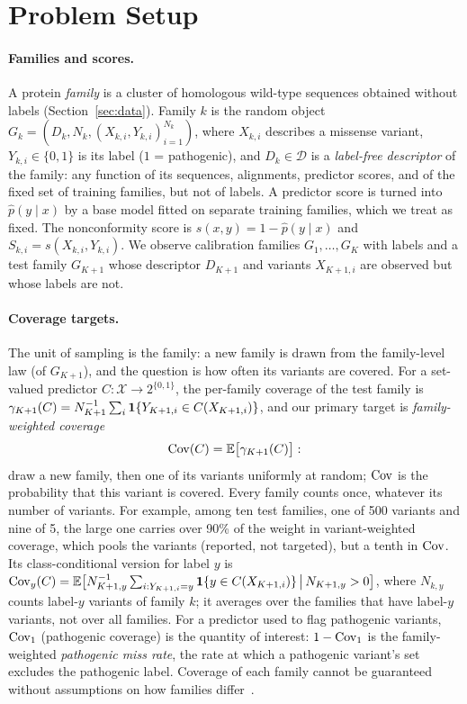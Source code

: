 \section{Problem Setup}\label{sec:setup}

\paragraph{Families and scores.}
A protein \emph{family} is a cluster of homologous wild-type sequences obtained without labels (Section~\ref{sec:data}). Family $k$ is the random object
$G_k=(D_k,N_k,(X_{k,i},Y_{k,i})_{i=1}^{N_k})$, where $X_{k,i}$ describes a missense variant, $Y_{k,i}\in\{0,1\}$ is its label ($1$ = pathogenic), and $D_k\in\mathcal{D}$ is a \emph{label-free descriptor} of the family: any function of its sequences, alignments, predictor scores, and of the fixed set of training families, but not of labels.
A predictor score is turned into $\hat p(y\mid x)$ by a base model fitted on separate training families, which we treat as fixed. The nonconformity score is $s(x,y)=1-\hat p(y\mid x)$ and $S_{k,i}=s(X_{k,i},Y_{k,i})$.
We observe calibration families $G_1,\dots,G_K$ with labels and a test family $G_{K+1}$ whose descriptor $D_{K+1}$ and variants $X_{K+1,i}$ are observed but whose labels are not.

\paragraph{Coverage targets.}
The unit of sampling is the family: a new family is drawn from the family-level law (of $G_{K+1}$), and the question is how often its variants are covered. For a set-valued predictor $C:\mathcal{X}\to 2^{\{0,1\}}$, the per-family coverage of the test family is $\gamma_{K+1}(C)=N_{K+1}^{-1}\sum_{i}\mathbf{1}\{Y_{K+1,i}\in C(X_{K+1,i})\}$, and our primary target is \emph{family-weighted coverage}
\begin{equation}
\mathrm{Cov}(C)=\mathbb{E}\big[\gamma_{K+1}(C)\big]:
\end{equation}
draw a new family, then one of its variants uniformly at random; $\mathrm{Cov}$ is the probability that this variant is covered. Every family counts once, whatever its number of variants. For example, among ten test families, one of 500 variants and nine of 5, the large one carries over 90\% of the weight in variant-weighted coverage, which pools the variants (reported, not targeted), but a tenth in $\mathrm{Cov}$. Its class-conditional version for label $y$ is
$\mathrm{Cov}_y(C)=\mathbb{E}\big[N_{K+1,y}^{-1}\sum_{i:Y_{K+1,i}=y}\mathbf{1}\{y\in C(X_{K+1,i})\}\,\big|\,N_{K+1,y}>0\big]$, where $N_{k,y}$ counts label-$y$ variants of family $k$; it averages over the families that have label-$y$ variants, not over all families. For a predictor used to flag pathogenic variants, $\mathrm{Cov}_1$ (pathogenic coverage) is the quantity of interest: $1-\mathrm{Cov}_1$ is the family-weighted \emph{pathogenic miss rate}, the rate at which a pathogenic variant's set excludes the pathogenic label. Coverage of each family cannot be guaranteed without assumptions on how families differ~\cite{vovk2012conditional}.

